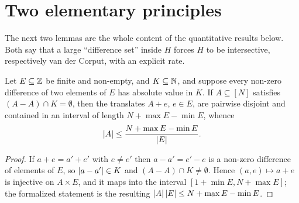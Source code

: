 \section{Two elementary principles}

The next two lemmas are the whole content of the quantitative results below.
Both say that a large ``difference set'' inside $H$ forces $H$ to be
intersective, respectively van der Corput, with an explicit rate.

\begin{lemma}
  \label{lem:packing}
  \leanok
  Let $E \subseteq \mathbb{Z}$ be finite and non-empty, and $K \subseteq \mathbb{N}$, and
  suppose every non-zero difference of two elements of $E$ has absolute value
  in $K$. If $A \subseteq [N]$ satisfies $(A - A) \cap K = \emptyset$, then
  the translates $A + e$, $e \in E$, are pairwise disjoint and contained in an
  interval of length $N + \max E - \min E$, whence
  \[
    \left\lvert A \right\rvert \leq \frac{N + \max E - \min E}{\left\lvert E \right\rvert} .
  \]
\end{lemma}
\begin{proof}
  \leanok
  If $a + e = a' + e'$ with $e \neq e'$ then $a - a' = e' - e$ is a non-zero
  difference of elements of $E$, so $\left\lvert a - a' \right\rvert \in K$ and
  $(A-A) \cap K \neq \emptyset$. Hence $(a,e) \mapsto a + e$ is injective on
  $A \times E$, and it maps into the interval
  $[1 + \min E, N + \max E]$; the formalized statement is the resulting
  $\left\lvert A \right\rvert\left\lvert E \right\rvert \leq N + \max E - \min E$.
\end{proof}

